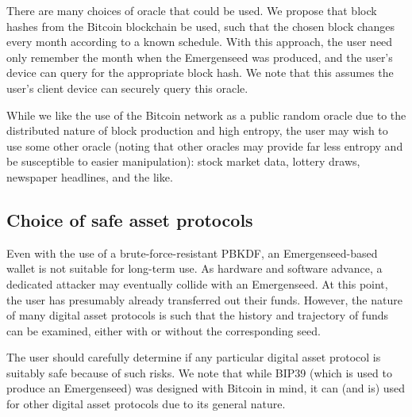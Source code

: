 \documentclass{article}
\begin{document}
There are many choices of oracle that could be used.
We propose that block hashes from the Bitcoin blockchain be used, such that the chosen block changes every month according to a known schedule.
With this approach, the user need only remember the month when the Emergenseed was produced, and the user's device can query for the appropriate block hash.
We note that this assumes the user's client device can securely query this oracle.

While we like the use of the Bitcoin network as a public random oracle due to the distributed nature of block production and high entropy, the user may wish to use some other oracle (noting that other oracles may provide far less entropy and be susceptible to easier manipulation): stock market data, lottery draws, newspaper headlines, and the like.


\subsection{Choice of safe asset protocols}

Even with the use of a brute-force-resistant PBKDF, an Emergenseed-based wallet is not suitable for long-term use.
As hardware and software advance, a dedicated attacker may eventually collide with an Emergenseed.
At this point, the user has presumably already transferred out their funds.
However, the nature of many digital asset protocols is such that the history and trajectory of funds can be examined, either with or without the corresponding seed.

The user should carefully determine if any particular digital asset protocol is suitably safe because of such risks.
We note that while BIP39 (which is used to produce an Emergenseed) was designed with Bitcoin in mind, it can (and is) used for other digital asset protocols due to its general nature.
\end{document}
